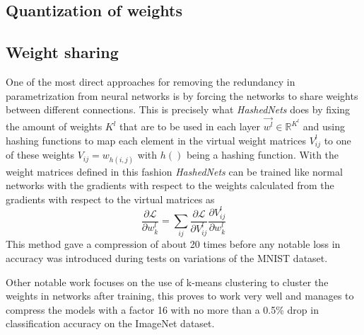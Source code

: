 \documentclass[11pt]{article}
\newcommand{\bibentry}[1]{\cite{#1}}
\begin{document}
\subsection*{Quantization of weights}
\label{sec:org8fe390b}


\subsection*{Weight sharing}
\label{sec:org90d895a}
One of the most direct approaches for removing the redundancy in parametrization from neural networks is by forcing the networks to share weights between different connections. This is precisely what \emph{HashedNets}\bibentry{chen2015compressing} does by fixing the amount of weights \(K^l\) that are to be used in each layer \(\vec{w^l} \in \mathbb{R}^{K^l}\)  and using hashing functions to map each element in the virtual weight matrices \(V_{ij}^l\) to one of these weights \(V_{ij} = w_{h(i,j)}\) with \(h()\) being a hashing function. With the weight matrices defined in this fashion \emph{HashedNets} can be trained like normal networks with the gradients with respect to the weights calculated from the gradients with respect to the virtual matrices as 
\[ \frac{\partial\mathcal{L}}{\partial w_k^l} = \sum_{ij} \frac{\partial\mathcal{L}}{\partial V_{ij}^l}\frac{\partial V_{ij}^l}{\partial w_k^l} \]
This method gave a compression of about 20 times before any notable loss in accuracy was introduced during tests on variations of the MNIST dataset.

Other notable work focuses on the use of k-means clustering to cluster the weights in networks after training\bibentry{gong2014compressing}, this proves to work very well and manages to compress the models with a factor 16 with no more than a 0.5\% drop in classification accuracy on the ImageNet dataset.
\end{document}
